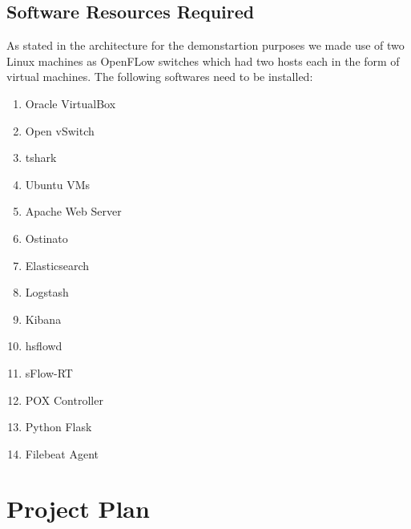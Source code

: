 \documentclass[12pt,a4paper,final]{report}
\begin{document}
\section{Software Resources Required}
As stated in the architecture for the demonstartion purposes we made use of two Linux machines as OpenFLow switches which had two hosts each in the form of virtual machines. The following softwares need to be installed:

\begin{enumerate}
\item
Oracle VirtualBox

\item
Open vSwitch

\item
tshark

\item
Ubuntu VMs

\item
Apache Web Server

\item
Ostinato

\item
Elasticsearch

\item
Logstash

\item
Kibana

\item
hsflowd

\item
sFlow-RT

\item
POX Controller

\item
Python Flask

\item
Filebeat Agent
\end{enumerate}


\newpage
{}
\chapter{Project Plan}
\thispagestyle{empty}
\newpage
\end{document}
